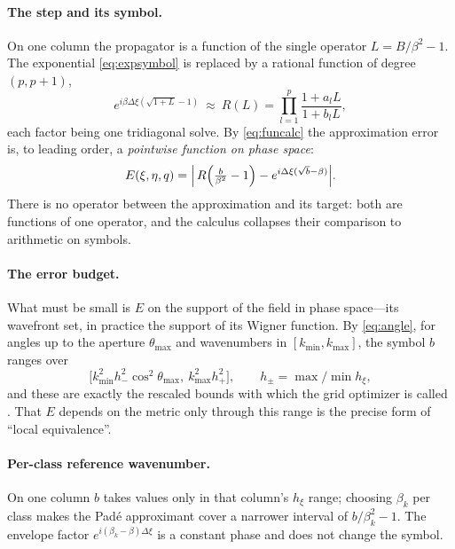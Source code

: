 \documentclass[11pt]{article}
\begin{document}
\paragraph{The step and its symbol.} On one column the propagator is a
function of the single operator $L=B/\beta^2-1$. The exponential
\eqref{eq:expsymbol} is replaced by a rational function of degree $(p,p+1)$,
\begin{equation}\label{eq:rational}
e^{i\beta\Delta\xi(\sqrt{1+L}-1)}\ \approx\ R(L)
=\prod_{l=1}^{p}\frac{1+a_lL}{1+b_lL},
\end{equation}
each factor being one tridiagonal solve. By \eqref{eq:funcalc} the
approximation error is, to leading order, a \emph{pointwise function on phase
space}:
\begin{equation}\label{eq:E}
E(\xi,\eta,q)=\Bigl|\,R\!\left(\tfrac b{\beta^2}-1\right)
-e^{i\Delta\xi(\sqrt b-\beta)}\Bigr| .
\end{equation}
There is no operator between the approximation and its target: both are
functions of one operator, and the calculus collapses their comparison to
arithmetic on symbols.

\paragraph{The error budget.} What must be small is $E$ on the support of the
field in phase space---its wavefront set, in practice the support of its
Wigner function. By \eqref{eq:angle}, for angles up to the aperture
$\theta_{\max}$ and wavenumbers in $[k_{\min},k_{\max}]$, the symbol $b$ ranges
over
\[
\bigl[k_{\min}^2h_-^2\cos^2\theta_{\max},\ k_{\max}^2h_+^2\bigr],
\qquad h_\pm=\max/\min h_\xi ,
\]
and these are exactly the rescaled bounds with which the grid optimizer is
called \cite{lytaev2020iccsa,lytaev2026nmp}. That $E$ depends on the metric
only through this range is the precise form of ``local equivalence''.

\paragraph{Per-class reference wavenumber.} On one column $b$ takes values
only in that column's $h_\xi$ range; choosing $\beta_k$ per class makes the
Pad\'e approximant cover a narrower interval of $b/\beta_k^2-1$. The envelope
factor $e^{i(\beta_k-\beta)\Delta\xi}$ is a constant phase and does not change
the symbol.
\end{document}
